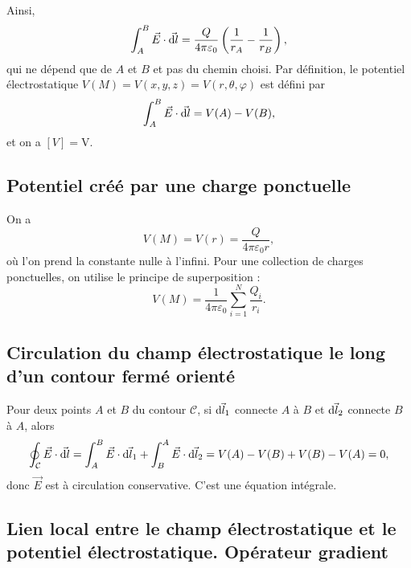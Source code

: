         Ainsi,
        \begin{equation*}
            \int_{A}^{B}\vec{E}\cdot\vec{\mathrm{d} l}=\frac{Q}{4\pi\varepsilon_{0}}\left(\frac{1}{r_{A}}-\frac{1}{r_{B}}\right),
        \end{equation*}
        qui ne dépend que de $A$ et $B$ et pas du chemin choisi. Par définition, le potentiel électrostatique $V(M)=V(x,y,z)=V(r,\theta,\varphi)$ est défini par 
        \begin{equation*}
            \int_{A}^{B}\vec{E}\cdot\vec{\mathrm{d} l}=V(A)-V(B),
        \end{equation*}
        et on a $[V]=\si{\volt}$.

    \subsection{Potentiel créé par une charge ponctuelle}

        On a 
        \begin{equation*}
            \boxed{
                V(M)=V(r)=\frac{Q}{4\pi\varepsilon_{0}r},
            }
        \end{equation*}
        où l'on prend la constante nulle à l'infini. Pour une collection de charges ponctuelles, on utilise le principe de superposition :
        \begin{equation*}
            \boxed{
                V(M)=\frac{1}{4\pi\varepsilon_{0}}\sum_{i=1}^{N}\frac{Q_i}{r_i}.
            }
        \end{equation*}

    \subsection{Circulation du champ électrostatique le long d'un contour fermé orienté}

        Pour deux points $A$ et $B$ du contour $\mathcal{C}$, si $\vec{\mathrm{d} l_{1}}$ connecte $A$ à $B$ et $\vec{\mathrm{d} l_{2}}$ connecte $B$ à $A$, alors 
        \begin{equation*}
            \oint_{\mathcal{C}}\vec{E}\cdot\vec{\mathrm{d} l}=\int_{A}^{B}\vec{E}\cdot\vec{\mathrm{d} l_{1}}+\int_{B}^{A}\vec{E}\cdot\vec{\mathrm{d} l_{2}}=V(A)-V(B)+V(B)-V(A)=0,
        \end{equation*}
        donc $\vec{E}$ est à circulation conservative. C'est une équation intégrale.

    \subsection{Lien local entre le champ électrostatique et le potentiel électrostatique. Opérateur gradient}

